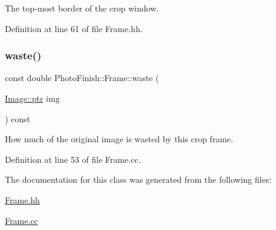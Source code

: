 The top-\/most border of the crop window. 



Definition at line 61 of file Frame.\+hh.

\mbox{\label{class_photo_finish_1_1_frame_a7411d047a4825aa6180d6db316b38f3d}} 
\subsubsection{\texorpdfstring{waste()}{waste()}}
{\footnotesize\ttfamily const double Photo\+Finish\+::\+Frame\+::waste (\begin{DoxyParamCaption}\item[{\hyperlink{class_photo_finish_1_1_image_ab336203305ed3a1397d7245063353b5a}{Image\+::ptr}}]{img }\end{DoxyParamCaption}) const}



How much of the original image is wasted by this crop frame. 



Definition at line 53 of file Frame.\+cc.



The documentation for this class was generated from the following files\+:\begin{DoxyCompactItemize}
\item 
\hyperlink{_frame_8hh}{Frame.\+hh}\item 
\hyperlink{_frame_8cc}{Frame.\+cc}\end{DoxyCompactItemize}
